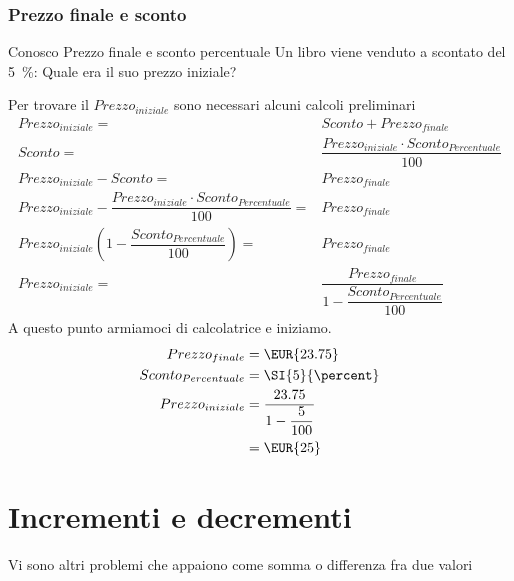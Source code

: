 \subsection{Prezzo finale e sconto}
	\begin{esempiot}{Conosco Prezzo finale e sconto percentuale}{}
Un libro viene venduto a  scontato del \SI{5}{\percent}: Quale era il suo prezzo iniziale?
\end{esempiot}
Per trovare il ${Prezzo}_{iniziale}$ sono necessari alcuni calcoli preliminari
\begin{align*}
	{Prezzo}_{iniziale}={}&Sconto+{Prezzo}_{finale}\\
		Sconto={}&\dfrac{{Prezzo}_{iniziale}\cdot {Sconto}_{Percentuale} }{100}\\
		{Prezzo}_{iniziale}-Sconto={}&{Prezzo}_{finale}\\
	{Prezzo}_{iniziale}-\dfrac{{Prezzo}_{iniziale}\cdot {Sconto}_{Percentuale} }{100}={}&{Prezzo}_{finale}\\
	{Prezzo}_{iniziale}\left(1-\dfrac{{Sconto}_{Percentuale} }{100}\right)={}&{Prezzo}_{finale}\\
	{Prezzo}_{iniziale}={}&\dfrac{{Prezzo}_{finale}}{1-\dfrac{{Sconto}_{Percentuale} }{100}}
\end{align*}
A questo punto armiamoci di calcolatrice e iniziamo.
\begin{align*}
	{Prezzo}_{finale}={}&\mbox{\EUR{23.75}}\\
	{Sconto}_{Percentuale}={}&\SI{5}{\percent}\\
{Prezzo}_{iniziale}={}&\dfrac{23.75}{1-\dfrac{5}{100}}\\
={}&\mbox{\EUR{25}}
\end{align*}
\chapter{Incrementi e decrementi}
Vi sono altri problemi che appaiono come somma o differenza fra due valori
